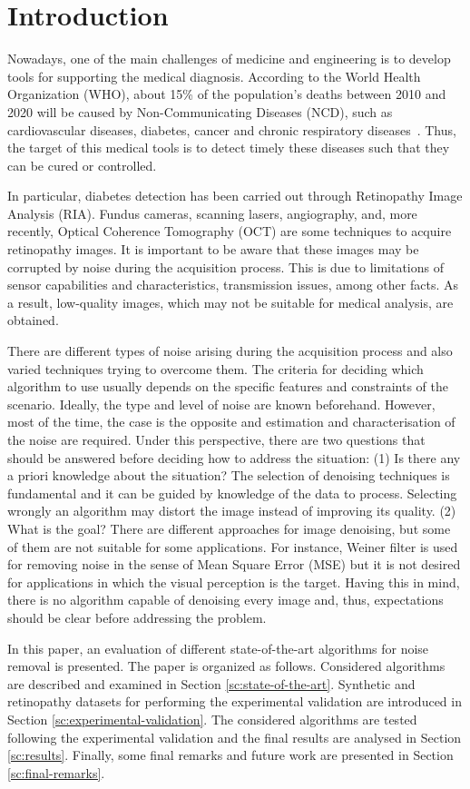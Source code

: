 \section{Introduction}

Nowadays, one of the main challenges of medicine and engineering is to develop tools for supporting the medical diagnosis. According to the World Health Organization (WHO), about 15\% of the population's deaths between 2010 and 2020 will be caused by Non-Communicating Diseases (NCD), such as cardiovascular diseases, diabetes, cancer and chronic respiratory diseases~\cite{who}. Thus, the target of this medical tools is to detect timely these diseases such that they can be cured or controlled.  %

In particular, diabetes detection has been carried out through Retinopathy Image Analysis (RIA). Fundus cameras, scanning lasers, angiography, and, more recently, Optical Coherence Tomography (OCT) are some techniques to acquire retinopathy images. It is important to be aware that these images may be corrupted by noise during the acquisition process. This is due to limitations of sensor capabilities and characteristics, transmission issues, among other facts. As a result, low-quality images, which may not be suitable for medical analysis, are obtained. 

There are different types of noise arising during the acquisition process and also varied techniques trying to overcome them. The criteria for deciding which algorithm to use usually depends on the specific features and constraints of the scenario. Ideally, the type and level of noise are known beforehand. However, most of the time, the case is the opposite and estimation and characterisation of the noise are required. Under this perspective, there are two questions that should be answered before deciding how to address the situation:
(1) Is there any a priori knowledge about the situation? The selection of denoising techniques is fundamental and it can be guided by knowledge of the data to process. Selecting wrongly an algorithm may distort the image instead of improving its quality. (2) What is the goal? There are different approaches for image denoising, but some of them are not suitable for some applications. For instance, Weiner filter is used for removing noise in the sense of Mean Square Error (MSE) but it is not desired for applications in which the visual perception is the target. Having this in mind, there is no algorithm capable of denoising every image and, thus,  expectations should be clear before addressing the problem.

In this paper, an evaluation of different state-of-the-art algorithms for noise removal is presented. The paper is organized as follows. Considered algorithms are described and examined in Section \ref{sc:state-of-the-art}. Synthetic and retinopathy datasets for performing the experimental validation are introduced in Section \ref{sc:experimental-validation}. The considered algorithms are tested following the experimental validation and the final results are analysed in Section \ref{sc:results}. Finally, some final remarks and future work are presented in Section \ref{sc:final-remarks}. 